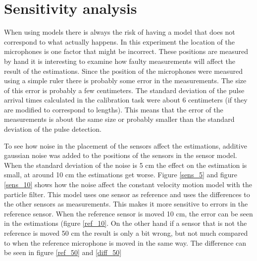 \documentclass[10pt,a4paper]{report}
\begin{document}
\section{Sensitivity analysis}
\label{Sensitivity analysis}
When using models there is always the risk of having a model that does not correspond to what actually happens.
In this experiment the location of the microphones is one factor that might be incorrect.
These positions are measured by hand it is interesting to examine how faulty measurements will affect the result of the estimations.
Since the position of the microphones were measured using a simple ruler there is probably some error in the measurements.
The size of this error is probably a few centimeters.
The standard deviation of the pulse arrival times calculated in the calibration task were about 6 centimeters (if they are modified to correspond to lengths).
This means that the error of the measurements is about the same size or probably smaller than the standard deviation of the pulse detection.

To see how noise in the placement of the sensors affect the estimations, additive gaussian noise was added to the positions of the sensors in the sensor model.
When the standard deviation of the noise is 5 cm the effect on the estimation is small, at around 10 cm the estimations get worse.
Figure \ref{sens_5} and figure \ref{sens_10} shows how the noise affect the constant velocity motion model with the particle filter.
This model uses one sensor as reference and uses the differences to the other sensors as measurements.
This makes it more sensitive to errors in the reference sensor.
When the reference sensor is moved 10 cm, the error can be seen in the estimations (figure \ref{ref_10}.
On the other hand if a sensor that is not the reference is moved 50 cm the result is only a bit wrong,
but not much compared to when the reference microphone is moved in the same way.
The difference can be seen in figure \ref{ref_50} and \ref{diff_50}
\end{document}
